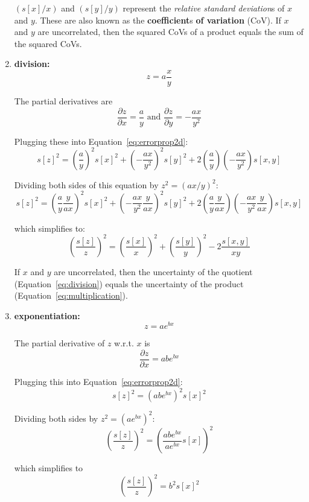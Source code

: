 \begin{enumerate}
  $(s[x]/x)$ and $(s[y]/y)$ represent the \textit{relative standard
    deviation}s of $x$ and $y$. These are also known as the
  \textbf{coefficient}s \textbf{of variation} (CoV).  If $x$ and $y$
  are uncorrelated, then the squared CoVs of a product equals the sum
  of the squared CoVs.

\item{\bf division:}
  \[
  z = a \frac{x}{y}
  \]

  The partial derivatives are
  \[
  \frac{\partial z}{\partial x} = \frac{a}{y} \mbox{~and~}
  \frac{\partial z}{\partial y} = -\frac{a x}{y^2}
  \]

  Plugging these into Equation~\ref{eq:errorprop2d}:
  \[
  s[z]^2 = \left(\frac{a}{y}\right)^2 s[x]^2 +
  \left(-\frac{a x}{y^2}\right)^2 s[y]^2 +
  2\left(\frac{a}{y}\right)\left(-\frac{a x}{y^2}\right) s[x,y]
  \]

  Dividing both sides of this equation by $z^2 =
  \left(a x / y\right)^2$:
  \[
  s[z]^2 = \left(\frac{a}{y}\frac{y}{ax}\right)^2 s[x]^2 +
  \left(-\frac{a x}{y^2}\frac{y}{ax}\right)^2 s[y]^2 +
  2\left(\frac{a}{y}\frac{y}{ax}\right)
  \left(-\frac{a x}{y^2}\frac{y}{ax}\right) s[x,y]
  \]

  which simplifies to:
  \begin{equation}
    \left(\frac{s[z]}{z}\right)^2 = \left(\frac{s[x]}{x}\right)^2 +
    \left(\frac{s[y]}{y}\right)^2 - 2 \frac{s[x,y]}{x y}
    \label{eq:division}
  \end{equation}

  If $x$ and $y$ are uncorrelated, then the uncertainty of the
  quotient (Equation~\ref{eq:division}) equals the uncertainty of the
  product (Equation~\ref{eq:multiplication}).

\item{\bf exponentiation:}
  \[
  z = a e^{bx}
  \]

  The partial derivative of $z$ w.r.t. $x$ is
  \[
  \frac{\partial z}{\partial x} = ab e^{bx}
  \]

  Plugging this into Equation~\ref{eq:errorprop2d}:
  \[
  s[z]^2 = \left(ab e^{bx}\right)^2 s[x]^2
  \]

  Dividing both sides by $z^2 = \left(a e^{bx}\right)^2$:
  \[
  \left(\frac{s[z]}{z}\right)^2 =
  \left(\frac{ab e^{bx}}{a e^{bx}}s[x]\right)^2 
  \]

  which simplifies to
  \begin{equation}
    \left(\frac{s[z]}{z}\right)^2 = b^2 s[x]^2
    \label{eq:exponentiation}
  \end{equation}


\end{enumerate}
